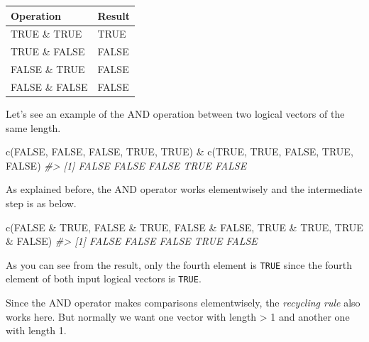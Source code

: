 \documentclass[
]{book}
\newenvironment{Shaded}{\begin{snugshade}}{\end{snugshade}}
\newcommand{\CommentTok}[1]{\textcolor[rgb]{0.56,0.35,0.01}{\textit{#1}}}
\newcommand{\ConstantTok}[1]{\textcolor[rgb]{0.00,0.00,0.00}{#1}}
\newcommand{\FunctionTok}[1]{\textcolor[rgb]{0.00,0.00,0.00}{#1}}
\newcommand{\NormalTok}[1]{#1}
\newcommand{\SpecialCharTok}[1]{\textcolor[rgb]{0.00,0.00,0.00}{#1}}
\begin{document}
\begin{tabular}{l|l}
\hline
Operation & Result\\
\hline
TRUE \& TRUE & TRUE\\
\hline
TRUE \& FALSE & FALSE\\
\hline
FALSE \& TRUE & FALSE\\
\hline
FALSE \& FALSE & FALSE\\
\hline
\end{tabular}

Let's see an example of the AND operation between two logical vectors of the same length.

\begin{Shaded}
\begin{Highlighting}[]
\FunctionTok{c}\NormalTok{(}\ConstantTok{FALSE}\NormalTok{, }\ConstantTok{FALSE}\NormalTok{, }\ConstantTok{FALSE}\NormalTok{, }\ConstantTok{TRUE}\NormalTok{, }\ConstantTok{TRUE}\NormalTok{) }\SpecialCharTok{\&} \FunctionTok{c}\NormalTok{(}\ConstantTok{TRUE}\NormalTok{, }\ConstantTok{TRUE}\NormalTok{, }\ConstantTok{FALSE}\NormalTok{, }\ConstantTok{TRUE}\NormalTok{, }\ConstantTok{FALSE}\NormalTok{)}
\CommentTok{\#\textgreater{} [1] FALSE FALSE FALSE  TRUE FALSE}
\end{Highlighting}
\end{Shaded}

As explained before, the AND operator works elementwisely and the intermediate step is as below.

\begin{Shaded}
\begin{Highlighting}[]
\FunctionTok{c}\NormalTok{(}\ConstantTok{FALSE} \SpecialCharTok{\&} \ConstantTok{TRUE}\NormalTok{, }\ConstantTok{FALSE} \SpecialCharTok{\&} \ConstantTok{TRUE}\NormalTok{, }\ConstantTok{FALSE} \SpecialCharTok{\&} \ConstantTok{FALSE}\NormalTok{, }\ConstantTok{TRUE} \SpecialCharTok{\&} \ConstantTok{TRUE}\NormalTok{, }\ConstantTok{TRUE} \SpecialCharTok{\&} \ConstantTok{FALSE}\NormalTok{)}
\CommentTok{\#\textgreater{} [1] FALSE FALSE FALSE  TRUE FALSE}
\end{Highlighting}
\end{Shaded}

As you can see from the result, only the fourth element is \texttt{TRUE} since the fourth element of both input logical vectors is \texttt{TRUE}.

Since the AND operator makes comparisons elementwisely, the \emph{recycling rule} also works here. But normally we want one vector with length \textgreater{} 1 and another one with length 1.
\end{document}
